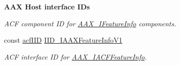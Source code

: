 \begin{Indent}{\bf A\+A\+X Host interface I\+Ds}
\begin{DoxyCompactItemize}
\begin{DoxyCompactList}\small\item\em A\+C\+F component I\+D for \hyperlink{a00100}{A\+A\+X\+\_\+\+I\+Feature\+Info} components. \end{DoxyCompactList}\item 
const \hyperlink{a00150_a59df0b41744eee7a066787aaedf97f67}{acf\+I\+I\+D} \hyperlink{a00299_a4bc11f4b2a3f9c7ca9162c6b3689978e}{I\+I\+D\+\_\+\+I\+A\+A\+X\+Feature\+Info\+V1}
\begin{DoxyCompactList}\small\item\em A\+C\+F interface I\+D for \hyperlink{a00065}{A\+A\+X\+\_\+\+I\+A\+C\+F\+Feature\+Info}. \end{DoxyCompactList}\end{DoxyCompactItemize}
\end{Indent}
